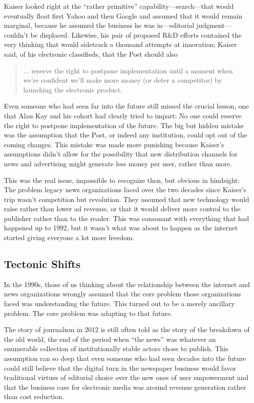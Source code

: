 Kaiser looked right at the ``rather primitive'' capability—search—that would
eventually float first Yahoo and then Google and assumed that it would remain
marginal, because he assumed the business he was in—editorial judgment—
couldn’t be displaced. Likewise, his pair of proposed R&D efforts contained the
very thinking that would sidetrack a thousand attempts at innovation; Kaiser said,
of his electronic classifieds, that the Post should also
\begin{quote}
... reserve the right to postpone implementation until a moment when
we’re confident we’ll make more money (or deter a competitor) by
launching the electronic product.
\end{quote}

Even someone who had seen far into the future still missed the crucial lesson,
one that Alan Kay and his cohort had clearly tried to impart: No one could
reserve the right to postpone implementation of the future. The big but hidden
mistake was the assumption that the Post, or indeed any institution, could opt out
of the coming changes. This mistake was made more punishing because Kaiser’s
assumptions didn’t allow for the possibility that new distribution channels for
news and advertising might generate less money per user, rather than more.

This was the real issue, impossible to recognize then, but obvious in hindsight:
The problem legacy news organizations faced over the two decades since Kaiser’s
trip wasn’t competition but revolution. They assumed that new technology
would raise rather than lower ad revenue, or that it would deliver more control to
the publisher rather than to the reader. This was consonant with everything that
had happened up to 1992, but it wasn’t what was about to happen as the internet
started giving everyone a lot more freedom.

\subsection{Tectonic Shifts}
In the 1990s, those of us thinking about the relationship between the internet
and news organizations wrongly assumed that the core problem those organizations
faced was understanding the future. This turned out to be a merely ancillary
problem. The core problem was adapting to that future.

The story of journalism in 2012 is still often told as the story of the breakdown of
the old world, the end of the period when ``the news'' was whatever an enumerable
collection of institutionally stable actors chose to publish. This assumption
ran so deep that even someone who had seen decades into the future could still
believe that the digital turn in the newspaper business would favor traditional
virtues of editorial choice over the new ones of user empowerment and that the
business case for electronic media was around revenue generation rather than
cost reduction.

